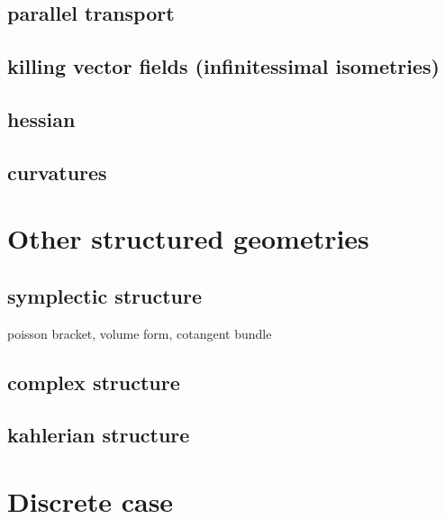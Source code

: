 \subsection{parallel transport}

\subsection{killing vector fields (infinitessimal isometries)}

\subsection{hessian}

\subsection{curvatures}


\clearpage
\section{Other structured geometries}

\subsection{symplectic structure}

poisson bracket, volume form, cotangent bundle

\subsection{complex structure}

\subsection{kahlerian structure}


\clearpage
\section{Discrete case}




